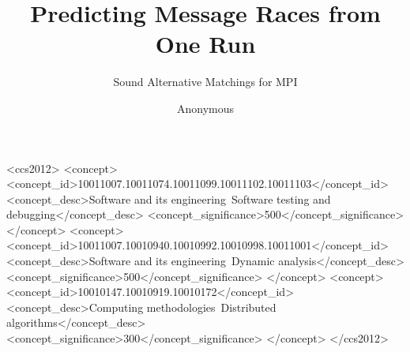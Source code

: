 \documentclass[acmsmall,screen,review,anonymous]{acmart}
\begin{document}
\title{Predicting Message Races from One Run}
\subtitle{Sound Alternative Matchings for MPI}

\author{Anonymous}

\begin{abstract}

\end{abstract}

\begin{CCSXML}
<ccs2012>
<concept>
<concept_id>10011007.10011074.10011099.10011102.10011103</concept_id>
<concept_desc>Software and its engineering~Software testing and debugging</concept_desc>
<concept_significance>500</concept_significance>
</concept>
<concept>
<concept_id>10011007.10010940.10010992.10010998.10011001</concept_id>
<concept_desc>Software and its engineering~Dynamic analysis</concept_desc>
<concept_significance>500</concept_significance>
</concept>
<concept>
<concept_id>10010147.10010919.10010172</concept_id>
<concept_desc>Computing methodologies~Distributed algorithms</concept_desc>
<concept_significance>300</concept_significance>
</concept>
</ccs2012>
\end{CCSXML}


\maketitle















\appendix




\end{document}
